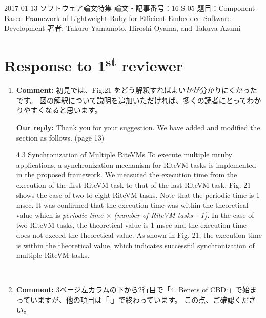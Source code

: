 \documentclass{article}
\newcommand\st{\textsuperscript{st}\xspace}
\begin{document}
\begin{flushleft}
  2017-01-13\newline 
  ソフトウェア論文特集\newline
  論文・記事番号：16-S-05\newline
  題目：Component-Based Framework of Lightweight Ruby for Efficient Embedded Software Development\newline
  著者: Takuro Yamamoto, Hiroshi Oyama, and Takuya Azumi\newline

\section{Response to 1\st reviewer}

\begin{enumerate}

\item \begin{flushleft}
    \textbf{Comment:
}初見では、Fig.21 をどう解釈すればよいかが分かりにくかったです。
図の解釈について説明を追加いただければ、多くの読者にとってわかりやすくなると思います。
  \end{flushleft}

  \begin{flushleft}
    \textbf{Our reply:}
Thank you for your suggestion.
We have added and modified the section as follows. (page 13)

\begin{itembox}[|]{4.3 Synchronization of Multiple RiteVMs}
To execute multiple mruby applications, a synchronization mechanism for RiteVM tasks is implemented in the proposed framework.
We measured the execution time from the execution of the first RiteVM task to that of the last RiteVM task.
Fig. 21 shows the case of two to eight RiteVM tasks.
Note that the periodic time is 1 msec.
It was confirmed that the execution time was within the theoretical value which is {\it\scriptsize periodic time $\times$ (number of RiteVM tasks - 1).}
In the case of two RiteVM tasks, the theoretical value is 1 msec and the execution time does not exceed the theoretical value. 
As shown in Fig. 21, the execution time is within the theoretical value, which indicates successful synchronization of multiple RiteVM tasks.
\end{itembox}\\
  \end{flushleft}


\item \begin{flushleft}
    \textbf{Comment:}
3ページ左カラムの下から2行目で「4. Benets of CBD:」で始まっていますが、他の項目は「.」で終わっています。
この点、ご確認ください。
  \end{flushleft}


\end{enumerate}
\end{flushleft}
\end{document}
